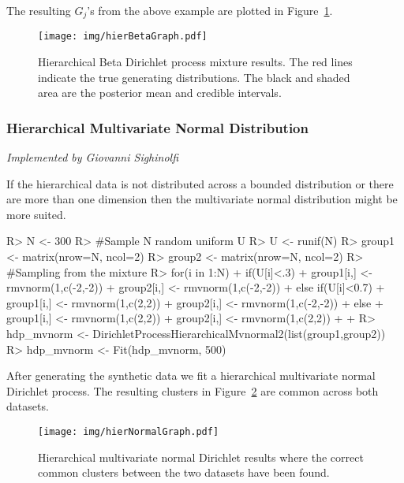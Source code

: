 \documentclass[nojss]{jss}
\begin{document}
The resulting $G_j$'s from the above example are plotted in Figure~\ref{fig:hierBeta}.
\begin{figure}
\centering
\texttt{[image: img/hierBetaGraph.pdf]}
\caption{Hierarchical Beta Dirichlet process mixture results. The red lines indicate the true generating distributions. The black and shaded area are the posterior mean and credible intervals.}
\label{fig:hierBeta}
\end{figure}

\subsubsection{Hierarchical Multivariate Normal Distribution}

\textit{Implemented by Giovanni Sighinolfi}

If the hierarchical data is not distributed across a bounded distribution or there are more than one dimension then the multivariate normal distribution might be more suited.

\begin{Schunk}
\begin{Sinput}
R> N <- 300
R> #Sample N random uniform U
R> U <- runif(N)
R> group1 <- matrix(nrow=N, ncol=2)
R> group2 <- matrix(nrow=N, ncol=2)
R> #Sampling from the mixture
R> for(i in 1:N){
+    if(U[i]<.3){
+      group1[i,] <- rmvnorm(1,c(-2,-2))
+      group2[i,] <- rmvnorm(1,c(-2,-2))
+    }else if(U[i]<0.7){
+      group1[i,] <- rmvnorm(1,c(2,2))
+      group2[i,] <- rmvnorm(1,c(-2,-2))
+    }else {
+      group1[i,] <- rmvnorm(1,c(2,2))
+      group2[i,] <- rmvnorm(1,c(2,2))
+    }
+  }
R> hdp_mvnorm <- DirichletProcessHierarchicalMvnormal2(list(group1,group2))
R> hdp_mvnorm <- Fit(hdp_mvnorm, 500)
\end{Sinput}
\end{Schunk}

After generating the synthetic data we fit a hierarchical multivariate normal Dirichlet process. The resulting clusters in Figure~\ref{fig:hierNormal} are common across both datasets.

\begin{figure}
\centering
\texttt{[image: img/hierNormalGraph.pdf]}
\caption{Hierarchical multivariate normal Dirichlet results where the correct common clusters between the two datasets have been found.}
\label{fig:hierNormal}
\end{figure}
\end{document}
